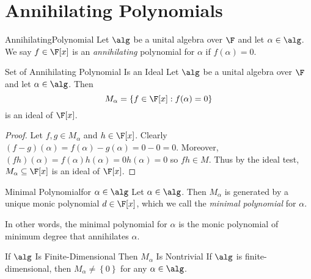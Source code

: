 \documentclass[math_245.tex]{subfiles}
\begin{document}

    \section{Annihilating Polynomials}

    \begin{definition}{Annihilating}{Polynomial}
        Let $\alg$ be a unital algebra over $\F$ and let $\alpha\in \alg$. We say $f\in \F[x]$ is an \emph{annihilating} polynomial for $\alpha$ if $f(\alpha) = 0$.
    \end{definition}

    \begin{prop}{Set of Annihilating Polynomial Is an Ideal}
        Let $\alg$ be a unital algebra over $\F$ and let $\alpha\in \alg$. Then
        \begin{equation*}
            M_\alpha = \left\lbrace f\in \F[x]: f(\alpha) = 0 \right\rbrace 
        \end{equation*}
        is an ideal of $\F[x]$.
    \end{prop}

    \begin{proof}
        Let $f,g\in M_\alpha$ and $h\in \F[x]$. Clearly $(f-g)(\alpha) = f(\alpha)-g(\alpha) = 0 - 0 = 0$. Moreover, $(fh)(\alpha) = f(\alpha)h(\alpha) = 0h(\alpha) = 0$ so $fh\in M$. Thus by the ideal test, $M_\alpha\subseteq\F[x]$ is an ideal of $\F[x]$.
    \end{proof}

    \begin{definition}{Minimal Polynomial}{for $\alpha\in\alg$}
        Let $\alpha\in\alg$. Then $M_\alpha$ is generated by a unique monic polynomial $d\in \F[x]$, which we call the \emph{minimal polynomial} for $\alpha$. 
    \end{definition}

    \begin{remark}
        In other words, the minimal polynomial for $\alpha$ is the monic polynomial of minimum degree that annihilates $\alpha$.
    \end{remark}

    \begin{prop}{If $\alg$ Is Finite-Dimensional Then $M_\alpha$ Is Nontrivial}
        If $\alg$ is finite-dimensional, then $M_\alpha\neq \left\lbrace 0 \right\rbrace$ for any $\alpha\in\alg$.
    \end{prop}
\end{document}
